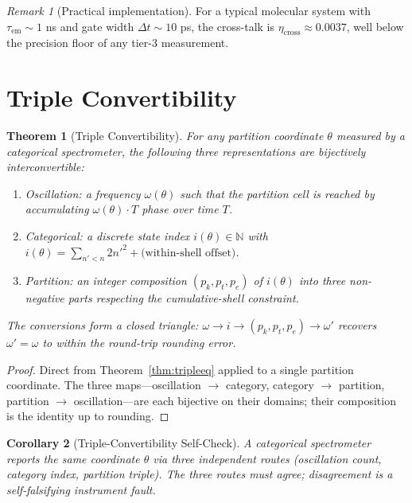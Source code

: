 \documentclass[twocolumn,11pt,a4paper]{article}
\theoremstyle{thmstyle}
\newtheorem{theorem}{Theorem}[section]
\newtheorem{corollary}[theorem]{Corollary}
\theoremstyle{axiomstyle}
\theoremstyle{definition}
\theoremstyle{remark}
\newtheorem*{remark}{Remark}
\newcommand{\Natural}{\mathbb{N}}
\begin{document}
\begin{remark}[Practical implementation]
For a typical molecular system with $\tau_{\mathrm{em}}\sim 1$ ns and gate width $\Delta t\sim 10$ ps, the cross-talk is $\eta_{\mathrm{cross}}\approx 0.0037$, well below the precision floor of any tier-3 measurement.
\end{remark}

\section{Triple Convertibility}
\label{sec:tripleconv}

\begin{theorem}[Triple Convertibility]\label{thm:tripleconv}
For any partition coordinate $\theta$ measured by a categorical spectrometer, the following three representations are bijectively interconvertible:
\begin{enumerate}[label=(\alph*),nosep]
\item \emph{Oscillation:} a frequency $\omega(\theta)$ such that the partition cell is reached by accumulating $\omega(\theta)\cdot T$ phase over time $T$.
\item \emph{Categorical:} a discrete state index $i(\theta)\in\Natural$ with $i(\theta)=\sum_{n'<n}2n'^{2}+\text{(within-shell offset)}$.
\item \emph{Partition:} an integer composition $(p_{k},p_{t},p_{e})$ of $i(\theta)$ into three non-negative parts respecting the cumulative-shell constraint.
\end{enumerate}
The conversions form a closed triangle: $\omega\to i\to(p_{k},p_{t},p_{e})\to\omega'$ recovers $\omega'=\omega$ to within the round-trip rounding error.
\end{theorem}

\begin{proof}
Direct from Theorem~\ref{thm:tripleeq} applied to a single partition coordinate. The three maps---oscillation $\to$ category, category $\to$ partition, partition $\to$ oscillation---are each bijective on their domains; their composition is the identity up to rounding.
\end{proof}

\begin{corollary}[Triple-Convertibility Self-Check]\label{cor:tripleself}
A categorical spectrometer reports the same coordinate $\theta$ via three independent routes (oscillation count, category index, partition triple). The three routes must agree; disagreement is a self-falsifying instrument fault.
\end{corollary}
\end{document}
